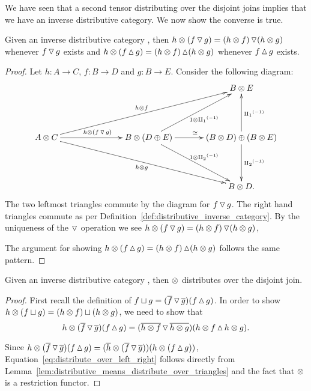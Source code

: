 We have seen that a second tensor distributing over the disjoint joins implies that we have an
inverse distributive category. We now show the converse is true.
\begin{lemma}\label{lem:distributive_means_distribute_over_triangles}
  Given an inverse distributive category \X, then $h\otimes(f\operatorname{\triangledown} g) = (h\otimes f) \operatorname{\triangledown} (h\otimes g)$
  whenever $f\operatorname{\triangledown} g$ exists and $h\otimes(f\operatorname{\vartriangle} g) = (h\otimes f) \operatorname{\vartriangle} (h\otimes g)$ whenever
  $f\operatorname{\vartriangle} g$ exists.
\end{lemma}
\begin{proof}
  Let $h:A \to C$, $f:B \to D$ and $g: B \to E$. Consider the following diagram:
  \[
    \xymatrix@R+20pt@C+10pt{
      & && B\*E\\
      A\*C \ar[rr]^{h\*(f\tjdown g)} \ar[drrr]_{h\*g} \ar[urrr]^{h\*f}
        && B \* (D \+ E) \ar[r]^{\cong} \ar[ur]_{1\*\icpa} \ar[dr]^{1\*\icpb}
        & (B\*D) \+ (B \* E) \ar[d]^{\icpb} \ar[u]_{\icpa}\\
      & && B\*D.
    }
  \]
  The two leftmost  triangles commute by the diagram for $f\operatorname{\triangledown} g$. The right hand triangles
  commute as per Definition~\ref{def:distributive_inverse_category}. By the uniqueness of the
  $\operatorname{\triangledown}$ operation we see  $h\otimes(f\operatorname{\triangledown} g) = (h\otimes f)\operatorname{\triangledown}(h\otimes g)$,

  The argument for showing $h\otimes(f\operatorname{\vartriangle} g) = (h\otimes f)\operatorname{\vartriangle}(h\otimes g)$ follows the same pattern.
\end{proof}
\begin{lemma}\label{lem:distributive_means_distribute_over_join}
  Given an inverse distributive category \X, then $\otimes$ distributes over the disjoint join.
\end{lemma}
\begin{proof}
  First recall the definition of $f\sqcup g = (\overline{f}\operatorname{\triangledown}\overline{g})(f\operatorname{\vartriangle} g)$. In order
  to show $h\otimes(f\sqcup g) = (h\otimes f)\sqcup (h\otimes g)$, we need to show that
  \begin{equation}
    h\otimes(\overline{f}\operatorname{\triangledown}\overline{g})(f\operatorname{\vartriangle} g) = (\overline{h\otimes f}\operatorname{\triangledown}\overline{h\otimes g})(h\otimes f\operatorname{\vartriangle} h\otimes g).
    \label{eq:distribute_over_left_right}
  \end{equation}

  Since $h\otimes(\overline{f}\operatorname{\triangledown}\overline{g})(f\operatorname{\vartriangle} g) =
  (\overline{h}\otimes(\overline{f}\operatorname{\triangledown}\overline{g}))(h\otimes(f\operatorname{\vartriangle} g))$, Equation~\ref{eq:distribute_over_left_right}
  follows directly from  Lemma~\ref{lem:distributive_means_distribute_over_triangles} and the fact
  that $\otimes$ is a  restriction functor.
\end{proof}

